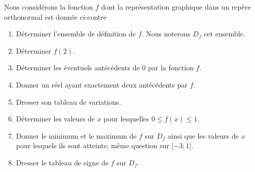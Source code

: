 
\begin{exercice}\label{exosmath-0547}

    \begin{center}
   
    \end{center}

Nous considérons la fonction \( f\) dont la représentation graphique dans un repère orthonormal est donnée ci-contre 
\begin{enumerate}
    \item
        Déterminer l'ensemble de définition de \( f\). Nous noterons \( D_f\) cet ensemble.
    \item
        Déterminer \( f(2)\).
    \item
        Déterminer les éventuels antécédents de \( 0\) par la fonction \( f\).
    \item
        Donner un réel ayant exactement deux antécédents par \( f\).
    \item
        Dresser son tableau de variations.
    \item
        Déterminer les valeurs de \( x\) pour lesquelles \( 0\leq f(x)\leq 1\).
    \item
        Donner le minimum et le maximum de \( f\) sur \( D_f\) ainsi que les valeurs de \( x\) pour lesquels ils sont atteints; même question sur \( \mathopen[ -3 ; 1 \mathclose]\).
    \item
        Dresser le tableau de signe de \( f\) sur \( D_f\).
\end{enumerate}

\end{exercice}
